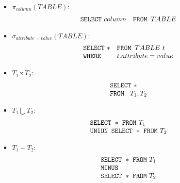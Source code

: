 \begin{exercise}{10}
\begin{subexercise}
  \begin{itemize}
    \item $\pi_{column}(TABLE)$:
          \begin{displaymath}
            \begin{array}{l l}
              \text{\texttt{SELECT}} \,\,column & \text{\texttt{FROM }} TABLE
            \end{array}
          \end{displaymath}
    \item $\sigma_{attribute=value}(TABLE)$:
          \begin{displaymath}
            \begin{array}{l l}
              \text{\texttt{SELECT}}\,\, * & \text{\texttt{FROM }} TABLE\,\,t\\
              \text{\texttt{WHERE}} & t.attribute = value
            \end{array}
          \end{displaymath}
    \item $T_1\,\text{x}\,T_2$:
          \begin{displaymath}
            \begin{array}{l}
              \text{\texttt{SELECT}}\,\, * \\
              \text{\texttt{FROM }}\,\, T_1, T_2\\
            \end{array}
          \end{displaymath}

    \item $T_1 \bigcup T_2$:
          \begin{displaymath}
            \begin{array}{l}
              \text{\texttt{SELECT}}\,\, * \,\, \text{\texttt{FROM}}\,\, T_1\\
              \text{\texttt{UNION SELECT}}\,\,*\,\,\text{\texttt{FROM}}\,\,T_2
            \end{array}
          \end{displaymath}
    \item $T_1 - T_2$:
          \begin{displaymath}
            \begin{array}{l}
              \text{\texttt{SELECT}}\,\, * \,\, \text{\texttt{FROM}}\,\, T_1\\
              \text{\texttt{MINUS}}\\
              \text{\texttt{SELECT}}\,\,*\,\,\text{\texttt{FROM}}\,\,T_2
            \end{array}
          \end{displaymath}
  \end{itemize}
  

\end{subexercise}
\end{exercise}
